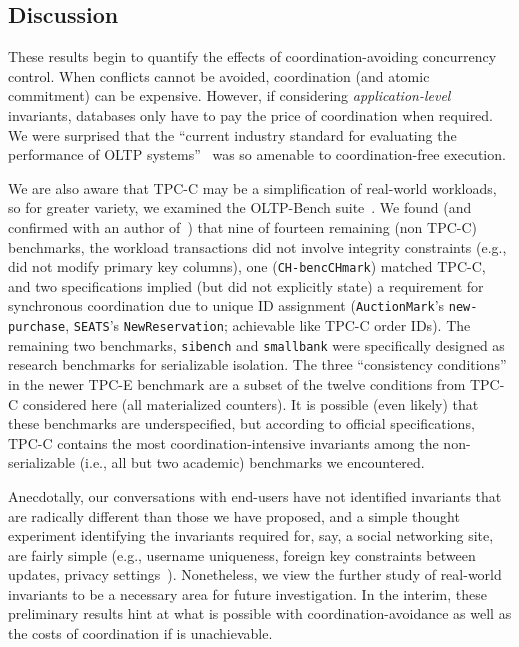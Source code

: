 \subsection{Discussion}

These results begin to quantify the effects of coordination-avoiding
concurrency control. When conflicts cannot be avoided, coordination
(and atomic commitment) can be expensive. However, if considering
\textit{application-level} invariants, databases only have to pay the
price of coordination when required. We were surprised that the
``current industry standard for evaluating the performance of OLTP
systems''~\cite{oltpbench} was so amenable to coordination-free
execution.

We are also aware that TPC-C may be a simplification of real-world
workloads, so for greater variety, we examined the OLTP-Bench
suite~\cite{oltpbench}. We found (and confirmed with an author
of~\cite{oltpbench}) that nine of fourteen remaining (non TPC-C)
benchmarks, the workload transactions did not involve integrity
constraints (e.g., did not modify primary key columns), one
(\texttt{CH-bencCHmark}) matched TPC-C, and two specifications implied
(but did not explicitly state) a requirement for synchronous
coordination due to unique ID assignment (\texttt{AuctionMark}'s
\texttt{new-purchase}, \texttt{SEATS}'s \texttt{NewReservation};
achievable like TPC-C order IDs). The remaining two benchmarks,
\texttt{sibench} and \texttt{smallbank} were specifically designed as
research benchmarks for serializable isolation. The three
``consistency conditions'' in the newer TPC-E benchmark are a subset
of the twelve conditions from TPC-C considered here (all materialized
counters). It is possible (even likely) that these benchmarks are
underspecified, but according to official specifications, TPC-C
contains the most coordination-intensive invariants among the
non-serializable (i.e., all but two academic) benchmarks we
encountered.

Anecdotally, our conversations with end-users have not identified
invariants that are radically different than those we have proposed,
and a simple thought experiment identifying the invariants required
for, say, a social networking site, are fairly simple (e.g., username
uniqueness, foreign key constraints between updates, privacy
settings~\cite{pnuts}). Nonetheless, we view the further study of
real-world invariants to be a necessary area for future
investigation. In the interim, these preliminary results hint at what
is possible with coordination-avoidance as well as the costs of
coordination if \cfreedom is unachievable.


